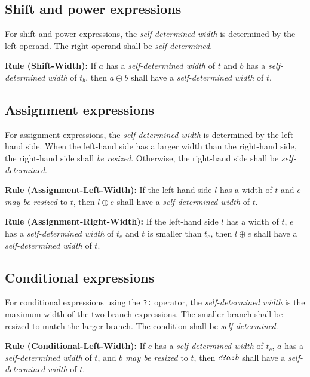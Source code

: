 \documentclass{article}
\newcommand{\sds}{\emph{self-determined width}}
\newcommand{\mbr}{\emph{may be resized}}
\newenvironment{typingrule}[1]%
{\par\noindent\textbf{Rule (#1):} }%
{\par}
\begin{document}
\subsection{Shift and power expressions}%

For shift and power expressions, the \sds{} is determined
by the left operand. The right operand shall be \emph{self-determined}.

\begin{typingrule}{Shift-Width}
  If $a$ has a \sds{} of $t$ and $b$ has a
  \sds{} of $t_{b}$, then $a \oplus b$ shall have a
  \sds{} of $t$.
\end{typingrule}

\subsection{Assignment expressions}%

For assignment expressions, the \sds{} is determined by the
left-hand side. When the left-hand side has a larger width than the right-hand
side, the right-hand side shall \emph{be resized}. Otherwise, the right-hand
side shall be \emph{self-determined}.

\begin{typingrule}{Assignment-Left-Width}
  If the left-hand side $l$ has a width of $t$ and $e$ \mbr{} to
  $t$, then $l \oplus e$ shall have a \sds{} of $t$.
\end{typingrule}

\begin{typingrule}{Assignment-Right-Width}
  If the left-hand side $l$ has a width of $t$, $e$ has a
  \sds{} of $t_{e}$ and $t$ is smaller than $t_{e}$, then
  $l \oplus e$ shall have a \sds{} of $t$.
\end{typingrule}

\subsection{Conditional expressions}%

For conditional expressions using the \texttt{?:} operator, the
\sds{} is the maximum width of the two branch expressions.
The smaller branch shall be resized to match the larger branch. The condition
shall be \emph{self-determined}.

\begin{typingrule}{Conditional-Left-Width}
  If $c$ has a \sds{} of $t_{c}$, $a$ has a
  \sds{} of $t$, and $b$ \mbr{} to $t$,
  then $c \verb|?| a \verb|:| b$ shall have a \sds{} of
  $t$.
\end{typingrule}
\end{document}
